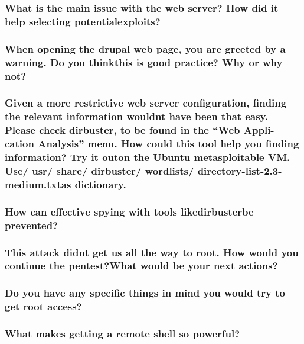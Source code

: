 \subsubsection{What is the main issue with the web server? How did it help selecting potentialexploits?}
\subsubsection{When opening the drupal web page, you are greeted by a warning. Do you thinkthis is good practice? Why or why not?}
\subsubsection{Given a more restrictive web server configuration, finding the relevant information wouldnt have been that easy. Please check dirbuster, to be found in the “Web Appli-cation Analysis” menu. How could this tool help you finding information? Try it outon the Ubuntu metasploitable VM. Use/ usr/ share/ dirbuster/ wordlists/ directory-list-2.3-medium.txtas dictionary.}
\subsubsection{How can effective spying with tools likedirbusterbe prevented?}
\subsubsection{This attack didnt get us all the way to root. How would you continue the pentest?What would be your next actions?}
\subsubsection{Do you have any specific things in mind you would try to get root access?}
\subsubsection{What makes getting a remote shell so powerful?}
